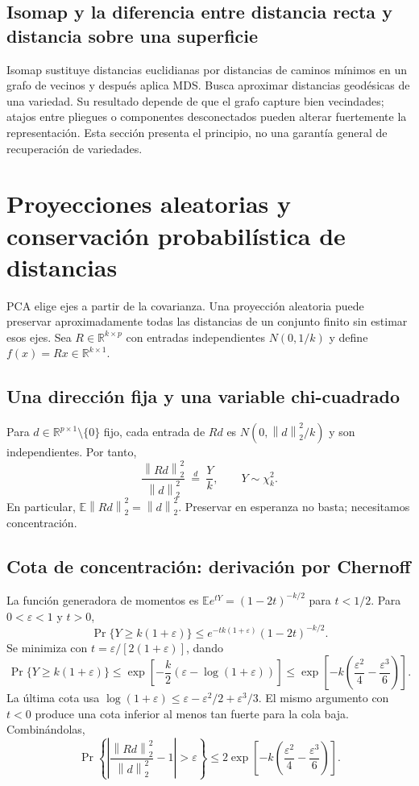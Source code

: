\documentclass[11pt,a4paper]{article}
\newcommand{\R}{\mathbb R}
\newcommand{\E}{\mathbb E}
\newcommand{\norm}[1]{\left\lVert #1\right\rVert}
\theoremstyle{definition}
\begin{document}
\subsection{Isomap y la diferencia entre distancia recta y distancia sobre una superficie}
Isomap sustituye distancias euclidianas por distancias de caminos mínimos en un grafo de vecinos y después aplica MDS. Busca aproximar distancias geodésicas de una variedad. Su resultado depende de que el grafo capture bien vecindades; atajos entre pliegues o componentes desconectados pueden alterar fuertemente la representación. Esta sección presenta el principio, no una garantía general de recuperación de variedades.

\section{Proyecciones aleatorias y conservación probabilística de distancias}
PCA elige ejes a partir de la covarianza. Una proyección aleatoria puede preservar aproximadamente todas las distancias de un conjunto finito sin estimar esos ejes. Sea $R\in\R^{k\times p}$ con entradas independientes $N(0,1/k)$ y define $f(x)=Rx\in\R^{k\times1}$.
\subsection{Una dirección fija y una variable chi-cuadrado}
Para $d\in\R^{p\times1}\setminus\{0\}$ fijo, cada entrada de $Rd$ es $N(0,\norm d_2^2/k)$ y son independientes. Por tanto,
\[
\frac{\norm{Rd}_2^2}{\norm d_2^2}\ \overset{d}=\ \frac{Y}{k},\qquad Y\sim\chi_k^2.
\]
En particular, $\E\norm{Rd}_2^2=\norm d_2^2$. Preservar en esperanza no basta; necesitamos concentración.
\subsection{Cota de concentración: derivación por Chernoff}
La función generadora de momentos es $\E e^{tY}=(1-2t)^{-k/2}$ para $t<1/2$. Para $0<\varepsilon<1$ y $t>0$,
\[
\Pr\{Y\ge k(1+\varepsilon)\}\le e^{-tk(1+\varepsilon)}(1-2t)^{-k/2}.
\]
Se minimiza con $t=\varepsilon/[2(1+\varepsilon)]$, dando
\[
\Pr\{Y\ge k(1+\varepsilon)\}\le
\exp\left[-\frac k2(\varepsilon-\log(1+\varepsilon))\right]
\le\exp\left[-k\left(\frac{\varepsilon^2}4-\frac{\varepsilon^3}6\right)\right].
\]
La última cota usa $\log(1+\varepsilon)\le\varepsilon-\varepsilon^2/2+\varepsilon^3/3$. El mismo argumento con $t<0$ produce una cota inferior al menos tan fuerte para la cola baja. Combinándolas,
\[
\Pr\left\{\left|\frac{\norm{Rd}_2^2}{\norm d_2^2}-1\right|>\varepsilon\right\}
\le2\exp\left[-k\left(\frac{\varepsilon^2}4-\frac{\varepsilon^3}6\right)\right].
\]
\end{document}
